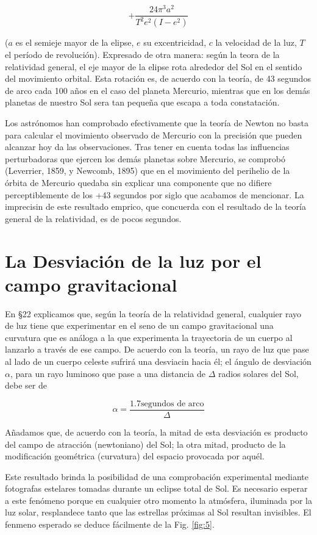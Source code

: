 \documentclass[spanish]{book}
\begin{document}
\[+\frac{24\pi^{3}a^{2}}{T^{2}e^{2}(I-e^{2})}\]

\noindent ($a$ es el semieje mayor de la elipse, $e$ su excentricidad, $c$ la velocidad de la luz, $T$ el
período de revolución). Expresado de otra manera: según la teora de la relatividad
general, el eje mayor de la elipse rota alrededor del Sol en el sentido del movimiento
orbital. Esta rotación es, de acuerdo con la teoría, de 43 segundos de arco cada 100
años en el caso del planeta Mercurio, mientras que en los demás planetas de nuestro
Sol sera tan pequeña que escapa a toda constatación.

Los astrónomos han comprobado efectivamente que la teoría de Newton no basta
para calcular el movimiento observado de Mercurio con la precisión que pueden
alcanzar hoy da las observaciones. Tras tener en cuenta todas las influencias
perturbadoras que ejercen los demás planetas sobre Mercurio, se comprobó
(Leverrier, 1859, y Newcomb, 1895) que en el movimiento del perihelio de la órbita
de Mercurio quedaba sin explicar una componente que no difiere perceptiblemente de
los +43 segundos por siglo que acabamos de mencionar. La imprecisin de este resultado
emprico, que concuerda con el resultado de la teoría general de la relatividad,
es de pocos segundos.


\section{La Desviación de la luz por el campo gravitacional}

En \S 22 explicamos que, según la teoría de la relatividad general, cualquier rayo de
luz tiene que experimentar en el seno de un campo gravitacional una curvatura que es
análoga a la que experimenta la trayectoria de un cuerpo al lanzarlo a través de ese
campo. De acuerdo con la teoría, un rayo de luz que pase al lado de un cuerpo celeste
sufrirá una desviacin hacia él; el ángulo de desviación $\alpha$, para un rayo luminoso
que pase a una distancia de $\Delta$ radios solares del Sol, debe ser de

\[\alpha=\frac{1.7\mbox{segundos de arco}}{\Delta}\]

Añadamos que, de acuerdo con la teoría, la mitad de esta desviación es producto del
campo de atracción (newtoniano) del Sol; la otra mitad, producto de la modificación
geométrica (curvatura) del espacio provocada por aquél.

Este resultado brinda la posibilidad de una comprobación experimental mediante
fotografas estelares tomadas durante un eclipse total de Sol. Es necesario esperar a este
fenómeno porque en cualquier otro momento la atmósfera, iluminada por la luz solar,
resplandece tanto que las estrellas próximas al Sol resultan invisibles. El fenmeno
esperado se deduce fácilmente de la Fig. \ref{fig:5}.
\end{document}
